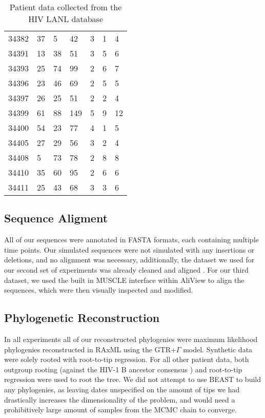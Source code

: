 \begin{table*}[!ht]
\begin{tabularx}{\textwidth}{ X | X | X | X | X | X | X }
34382 &       37 &        5 &       42 &        3 &        1 &        4  \\ 
34391 &       13 &       38 &       51 &        3 &        5 &        6  \\ 
34393 &       25 &       74 &       99 &        2 &        6 &        7  \\ 
34396 &       23 &       46 &       69 &        2 &        5 &        5 \\ 
34397 &       26 &       25 &       51 &        2 &        2 &        4  \\ 
34399 &       61 &       88 &      149 &        5 &        9 &       12  \\ 
34400 &       54 &       23 &       77 &        4 &        1 &        5  \\ 
34405 &       27 &       29 &       56 &        3 &        2 &        4  \\ 
34408 &        5 &       73 &       78 &        2 &        8 &        8 \\ 
34410 &       35 &       60 &       95 &        2 &        6 &        6 \\ 
34411 &       25 &       43 &       68 &        3 &        3 &        6   \\ \hline \hline
\end{tabularx}

  \caption{Patient data collected from the HIV LANL database}
\end{table*}

\subsection{Sequence Aligment} \label{subsec:seqalign}
All of our sequences were annotated in FASTA formats, each containing multiple time points. Our simulated sequences were not simulated with any insertions or deletions, and no alignment was necessary, additionally, the dataset we used for our second set of experiments was already cleaned and aligned \citep{McCloskey14}. For our third dataset, we used the built in MUSCLE \citep{Muscle04} interface within AliView \citep{AliView14} to align the sequences, which were then visually inspected and modified. 

\subsection{Phylogenetic Reconstruction} \label{subsec:phylo}
In all experiments all of our reconstructed phylogenies were maximum likelihood phylogenies reconstructed in RAxML \citep{Raxml14} using the GTR+$\Gamma$ model. Synthetic data were solely rooted with root-to-tip regression. For all other patient data, both outgroup rooting (against the HIV-1 B ancestor consensus \citep{HIVBANC}) and root-to-tip regression \cite{Ape04} were used to root the tree. We did not attempt to use BEAST \citep{BEAST} to build any phylogenies, as leaving dates unspecified on the amount of tips we had drastically increases the dimensionality of the problem, and would need a prohibitively large amount of samples from the MCMC chain to converge.

